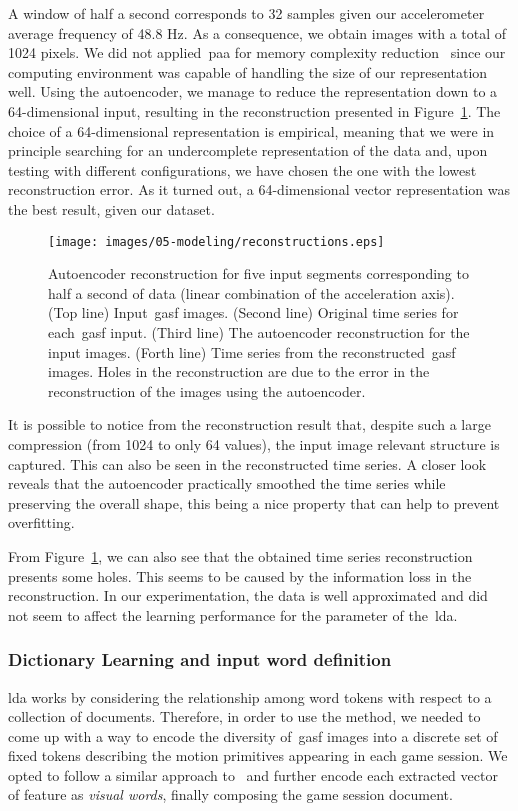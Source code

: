 A window of half a second corresponds to 32 samples given our accelerometer average frequency of 48.8 Hz. As a consequence, we obtain images with a total of 1024 pixels. We did not applied~\gls{paa} for memory complexity reduction~\citep{wang_time_2016} since our computing environment was capable of handling the size of our representation well. Using the autoencoder, we manage to reduce the representation down to a 64-dimensional input, resulting in the reconstruction presented in Figure~\ref{fig:reconstruction}. The choice of a 64-dimensional representation is empirical, meaning that we were in principle searching for an undercomplete representation of the data and, upon testing with different configurations, we have chosen the one with the lowest reconstruction error. As it turned out, a 64-dimensional vector representation was the best result, given our dataset. 

\begin{figure}[h]
	\centering
	\texttt{[image: images/05-modeling/reconstructions.eps]}
	\caption{Autoencoder reconstruction for five input segments corresponding to half a second of data (linear combination of the acceleration axis). ({Top line}) Input~\gls{gasf} images. ({Second line}) Original time series for each~\gls{gasf} input. ({Third line}) The autoencoder reconstruction for the input images. ({Forth line}) Time series from the reconstructed~\gls{gasf} images. Holes in the reconstruction are due to the error in the reconstruction of the images using the autoencoder.}
  \label{fig:reconstruction}
\end{figure}

It is possible to notice from the reconstruction result that, despite such a large compression (from 1024 to only 64 values), the input image relevant structure is captured. This can also be seen in the reconstructed time series. A closer look reveals that the autoencoder practically smoothed the time series while preserving the overall shape, this being a nice property that can help to prevent overfitting.

From Figure~\ref{fig:reconstruction}, we can also see that the obtained time series reconstruction presents some holes. This seems to be caused by the information loss in the reconstruction. In our experimentation, the data is well approximated and did not seem to affect the learning performance for the parameter of the~\gls{lda}. 

\subsubsection{Dictionary Learning and input word definition}
\glsdesc{lda} works by considering the relationship among word tokens with respect to a collection of documents. Therefore, in order to use the method, we needed to come up with a way to encode the diversity of~\gls{gasf} images into a discrete set of fixed tokens describing the motion primitives appearing in each game session. We opted to follow a similar approach to~\cite{prince_computer_2012} and further encode each extracted vector of feature as \textit{visual words}, finally composing the game session document. 

